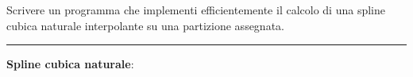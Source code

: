 Scrivere un programma che implementi efficientemente il calcolo di una spline cubica naturale interpolante su una partizione assegnata.

\hspace{1cm}
\par\noindent\rule{\textwidth}{0.4pt}
\hspace{1cm}

\textbf{Spline cubica naturale}:

